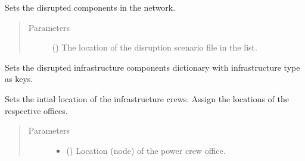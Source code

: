 \documentclass[letterpaper,10pt,english]{sphinxmanual}
\begin{document}
\begin{fulllineitems}
\begin{fulllineitems}
\label{\detokenize{apidoc:dreaminsg_integrated_model.src.network_sim_models.integrated_network.IntegratedNetwork.set_disrupted_components}}
\sphinxAtStartPar
Sets the disrupted components in the network.
\begin{quote}\begin{description}
\item[{Parameters}] \leavevmode
\sphinxAtStartPar
{} () \textendash{} The location of the disruption scenario file in the list.

\end{description}\end{quote}

\end{fulllineitems}


\begin{fulllineitems}
\label{\detokenize{apidoc:dreaminsg_integrated_model.src.network_sim_models.integrated_network.IntegratedNetwork.set_disrupted_infra_dict}}
\sphinxAtStartPar
Sets the disrupted infrastructure components dictionary with infrastructure type as keys.

\end{fulllineitems}


\begin{fulllineitems}
\label{\detokenize{apidoc:dreaminsg_integrated_model.src.network_sim_models.integrated_network.IntegratedNetwork.set_init_crew_locs}}
\sphinxAtStartPar
Sets the intial location of the infrastructure crews. Assign the locations of the respective offices.
\begin{quote}\begin{description}
\item[{Parameters}] \leavevmode\begin{itemize}
\item {} 
\sphinxAtStartPar
{} () \textendash{} Location (node) of the power crew office.


\end{itemize}
\end{description}
\end{quote}
\end{fulllineitems}
\end{fulllineitems}
\end{document}

